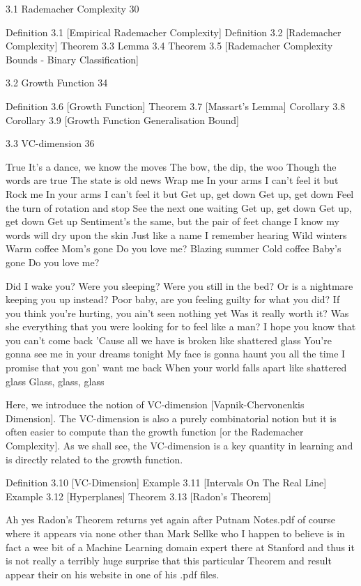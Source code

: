 3.1 Rademacher Complexity 30

Definition 3.1 [Empirical Rademacher Complexity]
Definition 3.2 [Rademacher Complexity]
Theorem 3.3
Lemma 3.4
Theorem 3.5 [Rademacher Complexity Bounds - Binary Classification]

3.2 Growth Function 34

Definition 3.6 [Growth Function]
Theorem 3.7 [Massart's Lemma]
Corollary 3.8
Corollary 3.9 [Growth Function Generalisation Bound]

3.3 VC-dimension 36

True
It's a dance, we know the moves
The bow, the dip, the woo
Though the words are true
The state is old news
Wrap me
In your arms
I can't feel it but
Rock me
In your arms
I can't feel it but
Get up, get down
Get up, get down
Feel the turn of rotation and stop
See the next one waiting
Get up, get down
Get up, get down
Get up
Sentiment's the same, but the pair of feet change
I know my words will dry upon the skin
Just like a name I remember hearing
Wild winters
Warm coffee
Mom's gone
Do you love me?
Blazing summer
Cold coffee
Baby's gone
Do you love me?

Did I wake you? Were you sleeping? Were you still in the bed?
Or is a nightmare keeping you up instead?
Poor baby, are you feeling guilty for what you did?
If you think you're hurting, you ain't seen nothing yet
Was it really worth it?
Was she everything that you were looking for to feel like a man?
I hope you know that you can't come back
'Cause all we have is broken like shattered glass
You're gonna see me in your dreams tonight
My face is gonna haunt you all the time
I promise that you gon' want me back
When your world falls apart like shattered glass
Glass, glass, glass

Here, we introduce the notion of VC-dimension [Vapnik-Chervonenkis Dimension]. The VC-dimension is also a purely combinatorial notion but it is often easier to compute than the growth function [or the Rademacher Complexity]. As we shall see, the VC-dimension is a key quantity in learning and is directly related to the growth function.

Definition 3.10 [VC-Dimension]
Example 3.11 [Intervals On The Real Line]
Example 3.12 [Hyperplanes]
Theorem 3.13 [Radon's Theorem]

Ah yes Radon's Theorem returns yet again after Putnam Notes.pdf of course where it appears via none other than Mark Sellke who I happen to believe is in fact a wee bit of a Machine Learning domain expert there at Stanford and thus it is not really a terribly huge surprise that this particular Theorem and result appear their on his website in one of his .pdf files.

